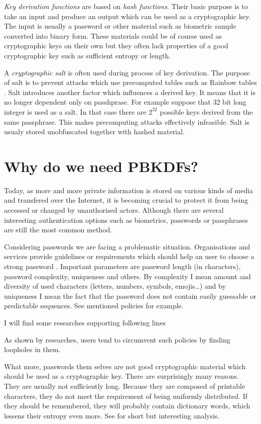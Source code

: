 \documentclass[nolof]{fithesis3}
\begin{document}
\emph{Key derivation functions} are based on \emph{hash functions}. Their basic purpose is to take an input and produce an output which can be used as a cryptographic key. The input is usually a password or other material such as biometric sample converted into binary form. These materials could be of course used as cryptographic keys on their own but they often lack properties of a good cryptographic key such as sufficient entropy or length. 

A \emph{cryptographic salt} is often used during process of key derivation. The purpose of salt is to prevent attacks which use precomputed tables such as Rainbow tables \parencite{rainbowtables}. Salt introduces another factor which influences a derived key. It means that it is no longer dependent only on passhprase. For example suppose that 32 bit long integer is used as a salt. In that case there are \(2^{32}\) possible keys derived from the same passphrase. This makes precomputing attacks effectively infeasible. Salt is usualy stored unobfuscated together with hashed material.

\section{Why do we need PBKDFs?}
\label{whypbkdfs}
Today, as more and more private information is stored on various kinds of media and transfered over the Internet, it is becoming crucial to protect it from being accessed or changed by unauthorised actors. Although there are several interesting authentication options such as biometrics, passwords or passphrases are still the most common method.

Considering passwords we are facing a problematic situation. Organisations and services provide guidelines or requirements which should help an user to choose a strong password \parencites{nistpasswords}{sanspasswordguidelines}. Important parameters are password length (in characters), password complexity, uniqueness and others. By complexity I mean amount and diversity of used characters (letters, numbers, symbols, emojis\dots) and by uniqueness I mean the fact that the password does not contain easily guessable or predictable sequences. See mentioned policies for example.

I will find some researches supporting following lines

As shown by researches, users tend to circumvent such policies by finding loopholes in them. %

What more, passwords them selves are not good cryptographic material which should be used as a cryptographic key. There are surprisingly many reasons. They are usually not sufficiently long. Because they are composed of printable characters, they do not meet the requirement of being uniformly distributed. If they should be remembered, they will probably contain dictionary words, which lessens their entropy even more. See \parencite[section 5.6.4]{itmc14} for short but interesting analysis.
\end{document}
